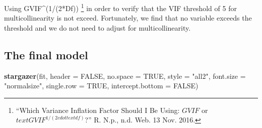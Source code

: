 \documentclass[]{article}
\newenvironment{Shaded}{\begin{snugshade}}{\end{snugshade}}
\newcommand{\KeywordTok}[1]{\textcolor[rgb]{0.13,0.29,0.53}{\textbf{{#1}}}}
\newcommand{\DataTypeTok}[1]{\textcolor[rgb]{0.13,0.29,0.53}{{#1}}}
\newcommand{\StringTok}[1]{\textcolor[rgb]{0.31,0.60,0.02}{{#1}}}
\newcommand{\OtherTok}[1]{\textcolor[rgb]{0.56,0.35,0.01}{{#1}}}
\newcommand{\NormalTok}[1]{{#1}}
\let\rmarkdownfootnote\footnote%
\def\footnote{\protect\rmarkdownfootnote}
\begin{document}
Using GVIF\^{}(1/(2*Df)) \footnote{``Which Variance Inflation Factor
  Should I Be Using: \(GVIF\) or \(text{GVIF}^{1/(2cdottext{df})}\)?''
  R. N.p., n.d. Web. 13 Nov. 2016.} in order to verify that the VIF
threshold of 5 for multicollinearity is not exceed. Fortunately, we find
that no variable exceeds the threshold and we do not need to adjust for
multicollinearity.

\subsection{The final model}\label{the-final-model}

\begin{Shaded}
\begin{Highlighting}[]
\KeywordTok{stargazer}\NormalTok{(fit, }\DataTypeTok{header =} \OtherTok{FALSE}\NormalTok{, }\DataTypeTok{no.space =} \OtherTok{TRUE}\NormalTok{, }
          \DataTypeTok{style =} \StringTok{"all2"}\NormalTok{, }\DataTypeTok{font.size =} \StringTok{"normalsize"}\NormalTok{, }
          \DataTypeTok{single.row =} \OtherTok{TRUE}\NormalTok{, }\DataTypeTok{intercept.bottom =} \OtherTok{FALSE}\NormalTok{)}
\end{Highlighting}
\end{Shaded}
\end{document}
